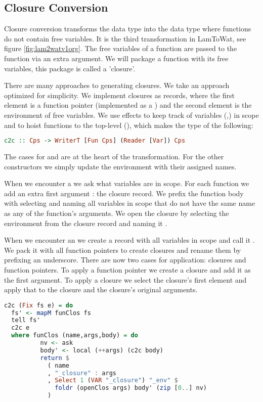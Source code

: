 {\subsection{\label{section:closconvert}Closure Conversion}
Closure conversion transforms the  data type into the  data type where functions do not contain free variables. It is the third transformation in LamToWat, see figure \ref{fig:lam2watv1org}. The free variables of a function are passed to the function via an extra argument. We will package a function with its free variables, this package is called a 'closure'.

There are many approaches to generating closures. We take an approach optimized for simplicity. We implement closures as records, where the first element is a function pointer (implemented as a ) and the second element is the environment of free variables. We use effects to keep track of variables (,) in scope and to hoist functions to the top-level (), which makes the type of  the following:

\begin{lstlisting}[language=Haskell]
c2c :: Cps -> WriterT [Fun Cps] (Reader [Var]) Cps
\end{lstlisting}

The cases for  and  are at the heart of the transformation. For the other constructors we simply update the environment with their assigned names.

When we encounter a  we ask what variables are in scope. For each function we add an extra first argument : the closure record. We prefix the function body with selecting and naming all variables in scope that do not have the same name as any of the function's arguments. We open the closure by selecting the environment from the closure record and naming it .

When we encounter an  we create a record with all variables in scope and call it . We pack it with all function pointers to create closures and rename them by prefixing an underscore. There are now two cases for application: closures and function pointers. To apply a function pointer we create a closure and add it as the first argument. To apply a closure we select the closure's first element and apply that to the closure and the closure's original arguments.

\begin{lstlisting}[language=Haskell]
c2c (Fix fs e) = do
  fs' <- mapM funClos fs
  tell fs'
  c2c e
  where funClos (name,args,body) = do
          nv <- ask
          body' <- local (++args) (c2c body)
          return $
            ( name
            , "_closure" : args
            , Select 1 (VAR "_closure") "_env" $
              foldr (openClos args) body' (zip [0..] nv)
            )


\end{lstlisting}}
